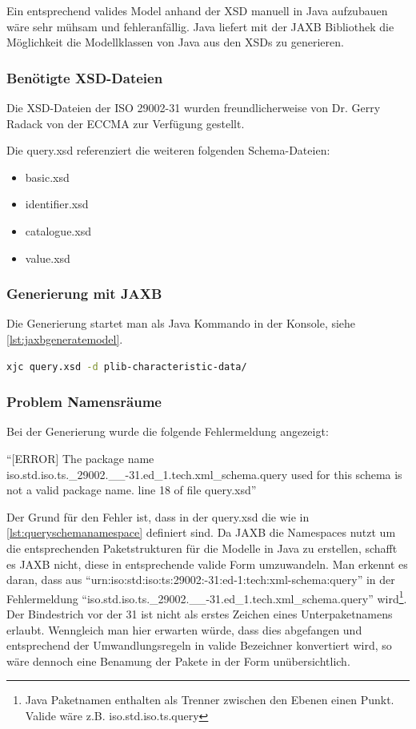 Ein entsprechend valides Model anhand der XSD manuell in Java aufzubauen wäre sehr mühsam und fehleranfällig. Java liefert mit der JAXB Bibliothek die Möglichkeit die Modellklassen von Java aus den XSDs zu generieren.

\subsubsection{Benötigte XSD-Dateien}

Die XSD-Dateien der ISO 29002-31 wurden freundlicherweise von Dr. Gerry Radack von der ECCMA zur Verfügung gestellt. 

Die query.xsd referenziert die weiteren folgenden Schema-Dateien:
\begin{itemize}
\item basic.xsd
\item identifier.xsd
\item catalogue.xsd
\item value.xsd
\end{itemize}

\subsubsection{Generierung mit JAXB}

Die Generierung startet man als Java Kommando in der Konsole, siehe \autoref{lst:jaxbgeneratemodel}.

\begin{lstlisting}[caption=JAXB Modellgenerierung von der Konsole, language=sh, label=lst:jaxbgeneratemodel]
xjc query.xsd -d plib-characteristic-data/ 
\end{lstlisting}

\subsubsection{Problem Namensräume}
Bei der Generierung wurde die folgende Fehlermeldung angezeigt:

\enquote{[ERROR] The package name iso.std.iso.ts.\_29002.\_\_-31.ed\_1.tech.xml\_schema.query used for this schema is not a valid package name. line 18 of file query.xsd}
  
Der Grund für den Fehler ist, dass in der query.xsd die  wie in  \autoref{lst:queryschemanamespace} definiert sind. Da JAXB die \Glspl{Namespace} nutzt um die entsprechenden Paketstrukturen für die Modelle in Java zu erstellen, schafft es JAXB nicht, diese in entsprechende valide Form umzuwandeln. Man erkennt es daran, dass aus \enquote{urn:iso:std:iso:ts:29002:-31:ed-1:tech:xml-schema:query} in der Fehlermeldung \enquote{iso.std.iso.ts.\_29002.\_\_-31.ed\_1.tech.xml\_schema.query} wird\footnote{Java Paketnamen enthalten als Trenner zwischen den Ebenen einen Punkt. Valide wäre z.B. iso.std.iso.ts.query}. Der Bindestrich vor der 31 ist nicht als erstes Zeichen eines  Unterpaketnamens erlaubt. Wenngleich man hier erwarten würde, dass dies abgefangen und entsprechend der Umwandlungsregeln in valide Bezeichner konvertiert wird, so wäre dennoch eine Benamung der Pakete in der Form unübersichtlich.  

